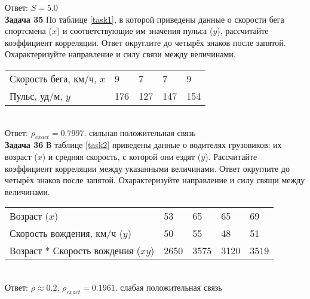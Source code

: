 \documentclass{article}
\begin{document}
Ответ: $S = 5.0$\\

\textbf{Задача 35} По таблице \ref{task1}, в которой приведены данные о скорости бега спортсмена ($x$) и соответствующие им значения пульса ($y$), рассчитайте коэффициент корреляции. Ответ округлите до четырёх знаков после запятой. Охарактеризуйте направление и силу связи между величинами.\\

\begin{minipage}{\textwidth}
\centering
\begin{tabularx}{0.8\textwidth}{lYYYY}
\toprule
Скорость бега, км/ч, $x$ & 9 & 7 & 7 & 9 \\
\addlinespace
Пульс, уд/м, $y$ & 176 & 127 & 147 & 154 \\
\bottomrule
\end{tabularx}
\label{task1}
\end{minipage} \\[35pt]

Ответ: $\rho_{exact} = 0.7997$. сильная положительная связь\\

\textbf{Задача 36} В таблице \ref{task2} приведены данные о водителях грузовиков: их возраст ($x$) и средняя скорость, с которой они ездят ($y$). Рассчитайте коэффициент корреляции между указанными величинами. Ответ округлите до четырёх знаков после запятой. Охарактеризуйте направление и силу свящи между величинами.\\

\begin{minipage}{\textwidth}
\centering
\begin{tabularx}{0.8\textwidth}{lYYYY}
\toprule
Возраст ($x$) & 53 & 65 & 65 & 69 \\
\addlinespace
Скорость вождения, км/ч ($y$) & 50 & 55 & 48 & 51 \\
\midrule
Возраст * Скорость вождения ($xy$) & 2650 & 3575 & 3120 & 3519 \\
\bottomrule
\end{tabularx}
\label{task2}
\end{minipage} \\[35pt]

Ответ: $\rho \approx 0.2$, $\rho_{exact} = 0.1961$. слабая положительная связь\\
\end{document}
